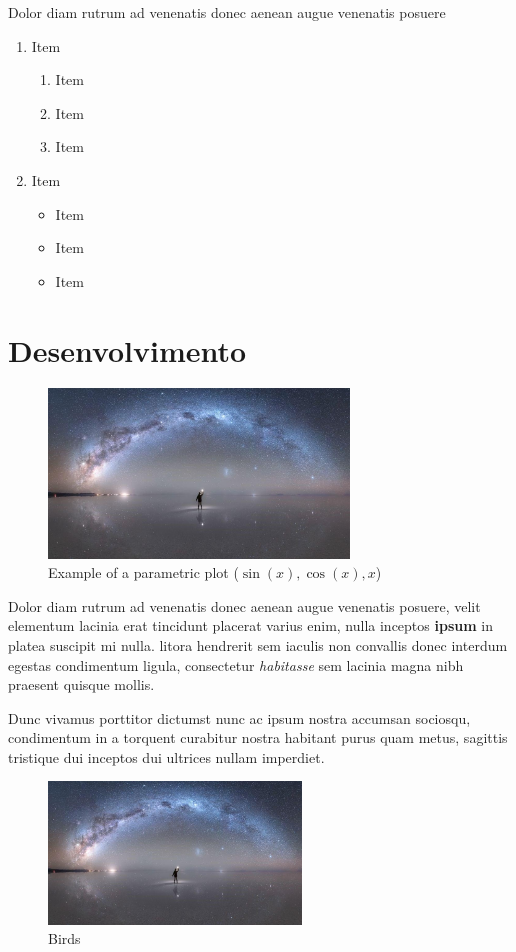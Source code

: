 \documentclass[a4paper, 12pt]{article}
\begin{document}
Dolor diam rutrum ad venenatis donec aenean augue venenatis posuere

	\begin{enumerate}
		\item Item
			\begin{enumerate}
				\item Item
				\item Item
				\item Item
			\end{enumerate}
		\item Item
			\begin{itemize}
				\item Item
				\item Item
				\item Item
			\end{itemize}
	\end{enumerate}

\newpage
\section{Desenvolvimento}
	\begin{figure}[h]
		\includegraphics[width=8cm]{image.png}
		\centering
		\caption{Example of a parametric plot ($\sin (x), \cos(x), x$)}
	\end{figure}

Dolor diam rutrum ad venenatis donec aenean augue venenatis posuere, velit elementum lacinia erat tincidunt placerat varius enim, nulla inceptos \textbf{ipsum} in platea suscipit mi nulla. litora hendrerit sem iaculis non convallis donec interdum egestas condimentum ligula, consectetur \textit{habitasse} sem lacinia magna nibh praesent quisque mollis. 

Dunc vivamus porttitor dictumst nunc ac ipsum nostra accumsan sociosqu, condimentum in a torquent curabitur nostra habitant purus quam metus, sagittis tristique dui inceptos dui ultrices nullam imperdiet. 

	\begin{figure}
		\begin{center}
			\includegraphics[width=0.6\textwidth]{image.png}
		\end{center}
		\caption{Birds}
	\end{figure}
\end{document}
